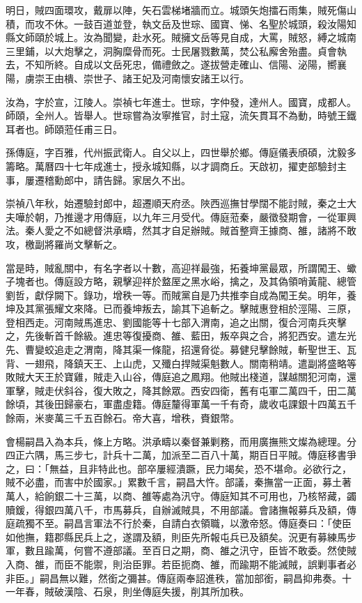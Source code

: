 \begin{pinyinscope}
明日，賊四面環攻，戴扉以陣，矢石雲梯堵牆而立。城頭矢炮擂石雨集，賊死傷山積，而攻不休。一鼓百道並登，執文岳及世琮、國寶、悌、名聖於城頭，殺汝陽知縣文師頤於城上。汝為聞變，赴水死。賊擁文岳等見自成，大罵，賊怒，縛之城南三里鋪，以大炮擊之，洞胸糜骨而死。士民屠戮數萬，焚公私廨舍殆盡。貞會執去，不知所終。自成以文岳死忠，備禮斂之。遂拔營走確山、信陽、泌陽，嚮襄陽，虜崇王由樻、崇世子、諸王妃及河南懷安諸王以行。

汝為，字於宣，江陵人。崇禎七年進士。世琮，字仲發，達州人。國寶，成都人。師頤，全州人。皆舉人。世琮嘗為汝寧推官，討土寇，流矢貫耳不為動，時號王鐵耳者也。師頤蒞任甫三日。

孫傳庭，字百雅，代州振武衛人。自父以上，四世舉於鄉。傳庭儀表頎碩，沈毅多籌略。萬曆四十七年成進士，授永城知縣，以才調商丘。天啟初，擢吏部驗封主事，屢遷稽勳郎中，請告歸。家居久不出。

崇禎八年秋，始遷驗封郎中，超遷順天府丞。陜西巡撫甘學闊不能討賊，秦之士大夫嘩於朝，乃推邊才用傳庭，以九年三月受代。傳庭蒞秦，嚴徵發期會，一從軍興法。秦人愛之不如總督洪承疇，然其才自足辦賊。賊首整齊王據商、雒，諸將不敢攻，檄副將羅尚文擊斬之。

當是時，賊亂關中，有名字者以十數，高迎祥最強，拓養坤黨最眾，所謂闖王、蠍子塊者也。傳庭設方略，親擊迎祥於盩厔之黑水峪，擒之，及其偽領哨黃龍、總管劉哲，獻俘闕下。錄功，增秩一等。而賊黨自是乃共推李自成為闖王矣。明年，養坤及其黨張耀文來降。已而養坤叛去，諭其下追斬之。擊賊惠登相於涇陽、三原，登相西走。河南賊馬進忠、劉國能等十七部入渭南，追之出關，復合河南兵夾擊之，先後斬首千餘級。進忠等復擾商、雒、藍田，叛卒與之合，將犯西安。遣左光先、曹變蛟追走之渭南，降其渠一條龍，招還脅從。募健兒擊餘賊，斬聖世王、瓦背、一翅飛，降鎮天王、上山虎，又殲白捍賊渠魁數人。關南稍靖。遣副將盛略等敗賊大天王於寶雞，賊走入山谷，傳庭追之鳳翔。他賊出棧道，謀越關犯河南，還軍擊，賊走伏斜谷，復大敗之，降其餘眾。西安四衛，舊有屯軍二萬四千，田二萬餘頃，其後田歸豪右，軍盡虛籍。傳庭釐得軍萬一千有奇，歲收屯課銀十四萬五千餘兩，米麥萬三千五百餘石。帝大喜，增秩，賚銀幣。

會楊嗣昌入為本兵，條上方略。洪承疇以秦督兼剿務，而用廣撫熊文燦為總理。分四正六隅，馬三步七，計兵十二萬，加派至二百八十萬，期百日平賊。傳庭移書爭之，曰：「無益，且非特此也。部卒屢經潰蹶，民力竭矣，恐不堪命。必欲行之，賊不必盡，而害中於國家。」累數千言，嗣昌大忤。部議，秦撫當一正面，募土著萬人，給餉銀二十三萬，以商、雒等處為汛守。傳庭知其不可用也，乃核帑藏，蠲贖鍰，得銀四萬八千，市馬募兵，自辦滅賊具，不用部議。會諸撫報募兵及額，傳庭疏獨不至。嗣昌言軍法不行於秦，自請白衣領職，以激帝怒。傳庭奏曰：「使臣如他撫，籍郡縣民兵上之，遂謂及額，則臣先所報屯兵已及額矣。況更有募練馬步軍，數且踰萬，何嘗不遵部議。至百日之期，商、雒之汛守，臣皆不敢委。然使賊入商、雒，而臣不能禦，則治臣罪。若臣扼商、雒，而踰期不能滅賊，誤剿事者必非臣。」嗣昌無以難，然銜之彌甚。傳庭兩奉詔進秩，當加部銜，嗣昌抑弗奏。十一年春，賊破漢陰、石泉，則坐傳庭失援，削其所加秩。


\end{pinyinscope}
